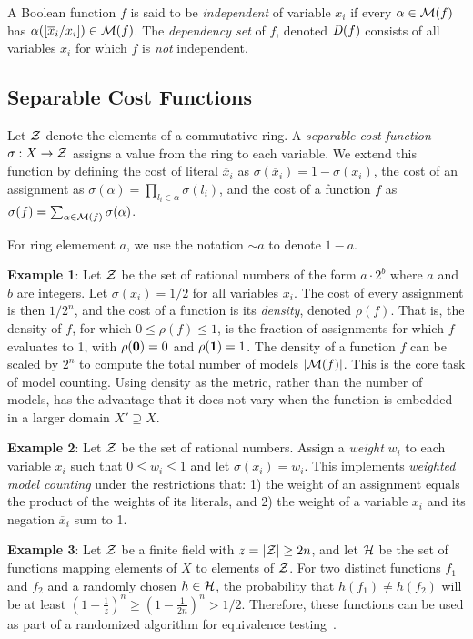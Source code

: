 \documentclass{llncs}
\newcommand{\one}{\mbox{\bf 1}}
\newcommand{\zero}{\mbox{\bf 0}}
\newcommand{\obar}[1]{\overline{#1}}
\newcommand{\oneminus}{{\sim}}
\newcommand{\interp}{\alpha}
\newcommand{\interpset}[1]{{\cal M}(#1)}
\newcommand{\ring}{{\cal Z}}
\newcommand{\cost}{\sigma}
\newcommand{\density}{\rho}
\newcommand{\hashset}{{\cal H}}
\newcommand{\fhash}{h}
\newcommand{\depend}{{\it D}}
\newcommand{\subs}[2]{[#2/#1]}
\begin{document}
A Boolean function $f$ is said to be {\em independent} of variable
$x_i$ if every $\interp \in \interpset{f}$ has
$\interp(\subs{x_i}{\obar{x}_i}) \in \interpset{f}$.
The {\em dependency set} of $f$, denoted
$\depend(f)$ consists of all variables $x_i$ for which $f$ is {\em
  not} independent.

\subsection{Separable Cost Functions}

Let $\ring$ denote the elements of a commutative ring.  A {\em
  separable cost function} $\cost:X \rightarrow \ring$ assigns a value
from the ring to each variable.  We extend this function by defining
the cost of literal $\obar{x}_i$ as $\cost(\obar{x}_i) = 1 - \cost(x_i)$, the cost
of an assignment as
$\cost(\interp) = \prod_{l_i \in \interp} \cost(l_i)$,
and the cost of a function $f$ as
$\cost(f) = \sum_{\interp \in \interpset{f}} \cost(\interp)$.

For ring elemement $a$, we use the notation $\oneminus a$ to denote $1 - a$.

{\bf Example 1}: Let $\ring$ be the set of rational numbers of the form $a\cdot 2^b$ where $a$ and $b$ are integers.
Let $\cost(x_i) = 1/2$ for all variables $x_i$.  The cost of every
assignment is then $1/2^{n}$, and the cost of a function is its
{\em density}, denoted $\density(f)$.  That is, the density of $f$, for which
$0 \leq \density(f) \leq 1$, 
is the fraction of assignments for which $f$
evaluates to 1, with $\density(\zero) = 0$ and $\density(\one) = 1$.  The density of a function
$f$ can be scaled by $2^n$ to compute the total number of models
$|\interpset{f}|$.  This is the core task of model counting.  Using
density as the metric, rather than the number of models, has the advantage that it does not vary when the
function is embedded in a larger domain $X' \supseteq X$.  

{\bf Example 2}: Let $\ring$ be the set of rational numbers.  Assign a
{\em weight} $w_i$ to each variable $x_i$ such that $0 \leq w_i \leq
1$ and let $\cost(x_i) = w_i$.  This implements {\em weighted model counting}
under the restrictions that: 
1) the
weight of an assignment equals the product of the weights of its
literals, and 2) the weight of a variable $x_i$ and its negation
$\obar{x}_i$ sum to 1.


{\bf Example 3}: Let $\ring$ be a finite field with $z = |\ring| \geq 2n$,
and let $\hashset$ be the set of functions
mapping elements of $X$ to elements of $\ring$.  For
two distinct functions $f_1$ and $f_2$ and a randomly chosen $\fhash
\in \hashset$, the probability that $h(f_1) \not = h(f_2)$ will be at least
$\left(1-\frac{1}{z}\right)^n \geq \left(1-\frac{1}{2n}\right)^n >  1/2$.  Therefore, these functions can be used as part of a
randomized algorithm for equivalence testing~\cite{blum:ipl:1980}.
\end{document}
